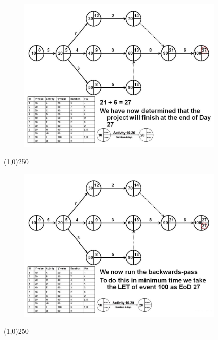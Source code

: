 \begin{frame}
\begin{figure}
	\centering
		\includegraphics[width = 10.0cm]{oldnotes/Slide110.jpg}
\end{figure}
\end{frame}
\begin{center}\line(1,0){250}\end{center}


\begin{frame}
\begin{figure}
	\centering
		\includegraphics[width = 10.0cm]{oldnotes/Slide111.jpg}
\end{figure}
\end{frame}
\begin{center}\line(1,0){250}\end{center}


